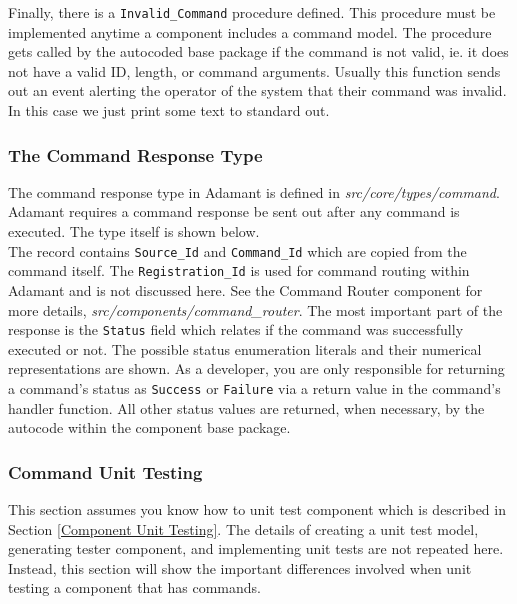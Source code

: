 Finally, there is a \texttt{Invalid\_Command} procedure defined. This procedure must be implemented anytime a component includes a command model. The procedure gets called by the autocoded base package if the command is not valid, ie. it does not have a valid ID, length, or command arguments. Usually this function sends out an event alerting the operator of the system that their command was invalid. In this case we just print some text to standard out. \\

\subsubsection{The Command Response Type}

The command response type in Adamant is defined in \textit{src/core/types/command}. Adamant requires a command response be sent out after any command is executed. The type itself is shown below. \\



The record contains \texttt{Source\_Id} and \texttt{Command\_Id} which are copied from the command itself. The \texttt{Registration\_Id} is used for command routing within Adamant and is not discussed here. See the Command Router component for more details, \textit{src/components/command\_router}. The most important part of the response is the \texttt{Status} field which relates if the command was successfully executed or not. The possible status enumeration literals and their numerical representations are shown. As a developer, you are only responsible for returning a command's status as \texttt{Success} or \texttt{Failure} via a return value in the command's handler function. All other status values are returned, when necessary, by the autocode within the component base package.

\subsubsection{Command Unit Testing} \label{Command Unit Testing}

This section assumes you know how to unit test component which is described in Section \ref{Component Unit Testing}. The details of creating a unit test model, generating tester component, and implementing unit tests are not repeated here. Instead, this section will show the important differences involved when unit testing a component that has commands. \\

